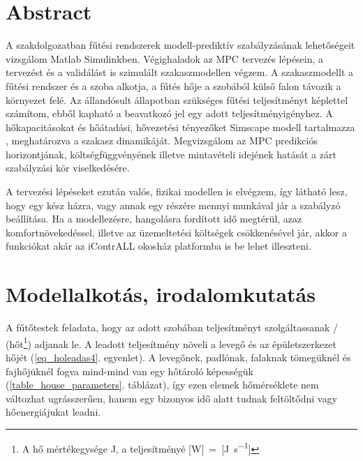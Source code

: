 \chapter*{Abstract}

A szakdolgozatban fűtési rendszerek modell-prediktív szabályzásának lehetőségeit vizsgálom Matlab Simulinkben. %
Végighaladok az MPC tervezés lépésein, a tervezést és a validálást is szimulált szakaszmodellen végzem. A szakaszmodellt a fűtési rendszer és a szoba alkotja, a fűtés hője a szobából külső falon távozik a környezet felé. Az állandósult állapotban szükséges fűtési teljesítményt képlettel számítom, ebből kapható a beavatkozó jel egy adott teljesítményigényhez. A hőkapacitásokat és hőátadási, hővezetési tényezőket Simscape modell tartalmazza%
, meghatározva a szakasz dinamikáját. Megvizsgálom az MPC predikciós horizontjának, költségfüggvényének illetve mintavételi idejének hatását a zárt szabályzási kör viselkedésére.  %

A tervezési lépéseket ezután valós, fizikai modellen is elvégzem, így látható lesz, hogy egy kész házra, vagy annak egy részére mennyi munkával jár a szabályzó beállítása. Ha a modellezésre, hangolásra fordított idő megtérül, azaz komfortnövekedéssel, illetve az üzemeltetési költségek csökkenésével jár, akkor a funkciókat akár az iContrALL okosház platformba is be lehet illeszteni.



\chapter{Modellalkotás, irodalomkutatás}


A fűtőtestek feladata, hogy az adott szobában teljesítményt szolgáltassanak / (hőt\footnote{A hő mértékegysége \si{\joule}, a teljesítményé [\si{\watt}]~=~[\si[per-mode=fraction]{\joule\per\second}]}) adjanak le. A leadott teljesítmény növeli a levegő és az épületszerkezet hőjét (\ref{eq_holeadas4}. egyenlet). A levegőnek, padlónak, falaknak tömegüknél és fajhőjüknél fogva mind-mind van egy hőtároló képességük (\ref{table_house_parameters}. táblázat), így ezen elemek hőmérséklete nem változhat ugrásszerűen, hanem egy bizonyos idő alatt tudnak feltöltődni vagy hőenergiájukat leadni. %

